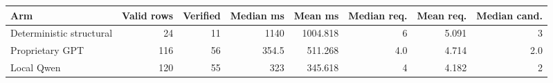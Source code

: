 \begin{tabular}{lrrrrrrr}
\hline
Arm & Valid rows & Verified & Median ms & Mean ms & Median req. & Mean req. & Median cand. \\
\hline
Deterministic structural & 24 & 11 & 1140 & 1004.818 & 6 & 5.091 & 3 \\
Proprietary GPT & 116 & 56 & 354.5 & 511.268 & 4.0 & 4.714 & 2.0 \\
Local Qwen & 120 & 55 & 323 & 345.618 & 4 & 4.182 & 2 \\
\hline
\end{tabular}
